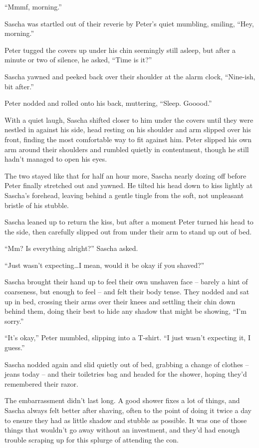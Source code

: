 ``Mmmf, morning.''

Sascha was startled out of their reverie by Peter's quiet mumbling, smiling, ``Hey, morning.''

Peter tugged the covers up under his chin seemingly still asleep, but after a minute or two of silence, he asked, ``Time is it?''

Sascha yawned and peeked back over their shoulder at the alarm clock, ``Nine-ish, bit after.''

Peter nodded and rolled onto his back, muttering, ``Sleep. Gooood.''

With a quiet laugh, Sascha shifted closer to him under the covers until they were nestled in against his side, head resting on his shoulder and arm slipped over his front, finding the most comfortable way to fit against him. Peter slipped his own arm around their shoulders and rumbled quietly in contentment, though he still hadn't managed to open his eyes.

The two stayed like that for half an hour more, Sascha nearly dozing off before Peter finally stretched out and yawned. He tilted his head down to kiss lightly at Sascha's forehead, leaving behind a gentle tingle from the soft, not unpleasant bristle of his stubble.

Sascha leaned up to return the kiss, but after a moment Peter turned his head to the side, then carefully slipped out from under their arm to stand up out of bed.

``Mm? Is everything alright?'' Sascha asked.

``Just wasn't expecting\ldots{}I mean, would it be okay if you shaved?''

Sascha brought their hand up to feel their own unshaven face -- barely a hint of coarseness, but enough to feel -- and felt their body tense. They nodded and sat up in bed, crossing their arms over their knees and settling their chin down behind them, doing their best to hide any shadow that might be showing, ``I'm sorry.''

``It's okay,'' Peter mumbled, slipping into a T-shirt. ``I just wasn't expecting it, I guess.''

Sascha nodded again and slid quietly out of bed, grabbing a change of clothes -- jeans today -- and their toiletries bag and headed for the shower, hoping they'd remembered their razor.

\secdiv{}

The embarrassment didn't last long. A good shower fixes a lot of things, and Sascha always felt better after shaving, often to the point of doing it twice a day to ensure they had as little shadow and stubble as possible. It was one of those things that wouldn't go away without an investment, and they'd had enough trouble scraping up for this splurge of attending the con.


